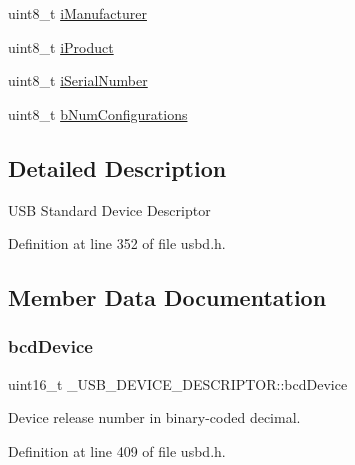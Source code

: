 \begin{DoxyCompactItemize}
\item 
uint8\+\_\+t \hyperlink{struct___u_s_b___d_e_v_i_c_e___d_e_s_c_r_i_p_t_o_r_a6eb47d1e9d3042347965cfb18fc5d4dc}{i\+Manufacturer}
\item 
uint8\+\_\+t \hyperlink{struct___u_s_b___d_e_v_i_c_e___d_e_s_c_r_i_p_t_o_r_a9708cc7afcfc5cdc57a153b9a750dc16}{i\+Product}
\item 
uint8\+\_\+t \hyperlink{struct___u_s_b___d_e_v_i_c_e___d_e_s_c_r_i_p_t_o_r_a54d859d8539d33e1534cf908503c0f13}{i\+Serial\+Number}
\item 
uint8\+\_\+t \hyperlink{struct___u_s_b___d_e_v_i_c_e___d_e_s_c_r_i_p_t_o_r_ab1b84ad03740fc1d69563fd6ae529164}{b\+Num\+Configurations}
\end{DoxyCompactItemize}


\subsection{Detailed Description}
U\+SB Standard Device Descriptor 

Definition at line 352 of file usbd.\+h.



\subsection{Member Data Documentation}
\mbox{\label{struct___u_s_b___d_e_v_i_c_e___d_e_s_c_r_i_p_t_o_r_a539ab3e3270f16d71310604f954b7d5a}} 
\subsubsection{\texorpdfstring{bcd\+Device}{bcdDevice}}
{\footnotesize\ttfamily uint16\+\_\+t \+\_\+\+U\+S\+B\+\_\+\+D\+E\+V\+I\+C\+E\+\_\+\+D\+E\+S\+C\+R\+I\+P\+T\+O\+R\+::bcd\+Device}

Device release number in binary-\/coded decimal. 

Definition at line 409 of file usbd.\+h.

\mbox{\label{struct___u_s_b___d_e_v_i_c_e___d_e_s_c_r_i_p_t_o_r_a962b24ee0aca162348882e358f71e435}} 

